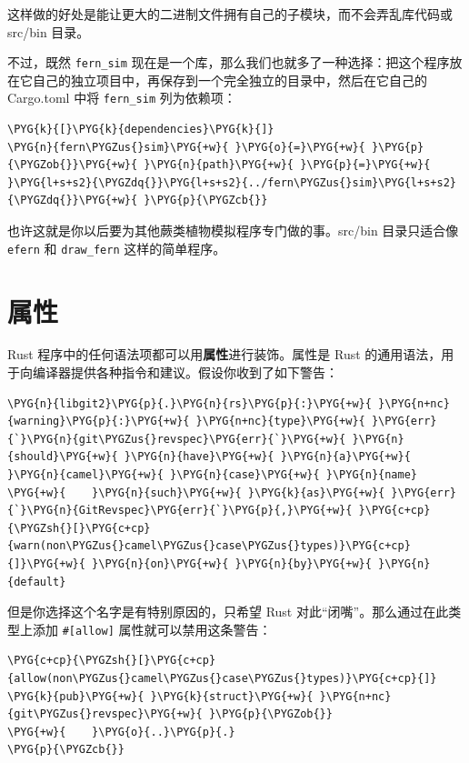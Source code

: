 这样做的好处是能让更大的二进制文件拥有自己的子模块，而不会弄乱库代码或 src/bin 目录。

不过，既然 \texttt{fern\_sim} 现在是一个库，那么我们也就多了一种选择：把这个程序放在它自己的独立项目中，再保存到一个完全独立的目录中，然后在它自己的 Cargo.toml 中将 \texttt{fern\_sim} 列为依赖项：

\begin{Verbatim}[commandchars=\\\{\},breaklines=true,breakanywhere=true,fontsize=\codefont,xleftmargin=17bp]
\PYG{k}{[}\PYG{k}{dependencies}\PYG{k}{]}
\PYG{n}{fern\PYGZus{}sim}\PYG{+w}{ }\PYG{o}{=}\PYG{+w}{ }\PYG{p}{\PYGZob{}}\PYG{+w}{ }\PYG{n}{path}\PYG{+w}{ }\PYG{p}{=}\PYG{+w}{ }\PYG{l+s+s2}{\PYGZdq{}}\PYG{l+s+s2}{../fern\PYGZus{}sim}\PYG{l+s+s2}{\PYGZdq{}}\PYG{+w}{ }\PYG{p}{\PYGZcb{}}
\end{Verbatim}

也许这就是你以后要为其他蕨类植物模拟程序专门做的事。src/bin 目录只适合像 \texttt{efern} 和 \texttt{draw\_fern} 这样的简单程序。

\section{属性}

Rust 程序中的任何语法项都可以用\textbf{属性}进行装饰。属性是 Rust 的通用语法，用于向编译器提供各种指令和建议。假设你收到了如下警告：

\begin{Verbatim}[commandchars=\\\{\},breaklines=true,breakanywhere=true,fontsize=\codefont,xleftmargin=17bp]
\PYG{n}{libgit2}\PYG{p}{.}\PYG{n}{rs}\PYG{p}{:}\PYG{+w}{ }\PYG{n+nc}{warning}\PYG{p}{:}\PYG{+w}{ }\PYG{n+nc}{type}\PYG{+w}{ }\PYG{err}{`}\PYG{n}{git\PYGZus{}revspec}\PYG{err}{`}\PYG{+w}{ }\PYG{n}{should}\PYG{+w}{ }\PYG{n}{have}\PYG{+w}{ }\PYG{n}{a}\PYG{+w}{ }\PYG{n}{camel}\PYG{+w}{ }\PYG{n}{case}\PYG{+w}{ }\PYG{n}{name}
\PYG{+w}{    }\PYG{n}{such}\PYG{+w}{ }\PYG{k}{as}\PYG{+w}{ }\PYG{err}{`}\PYG{n}{GitRevspec}\PYG{err}{`}\PYG{p}{,}\PYG{+w}{ }\PYG{c+cp}{\PYGZsh{}[}\PYG{c+cp}{warn(non\PYGZus{}camel\PYGZus{}case\PYGZus{}types)}\PYG{c+cp}{]}\PYG{+w}{ }\PYG{n}{on}\PYG{+w}{ }\PYG{n}{by}\PYG{+w}{ }\PYG{n}{default}
\end{Verbatim}

但是你选择这个名字是有特别原因的，只希望 Rust 对此“闭嘴”。那么通过在此类型上添加 \texttt{\#[allow]} 属性就可以禁用这条警告：

\begin{Verbatim}[commandchars=\\\{\},breaklines=true,breakanywhere=true,fontsize=\codefont,xleftmargin=17bp]
\PYG{c+cp}{\PYGZsh{}[}\PYG{c+cp}{allow(non\PYGZus{}camel\PYGZus{}case\PYGZus{}types)}\PYG{c+cp}{]}
\PYG{k}{pub}\PYG{+w}{ }\PYG{k}{struct}\PYG{+w}{ }\PYG{n+nc}{git\PYGZus{}revspec}\PYG{+w}{ }\PYG{p}{\PYGZob{}}
\PYG{+w}{    }\PYG{o}{..}\PYG{p}{.}
\PYG{p}{\PYGZcb{}}
\end{Verbatim}

